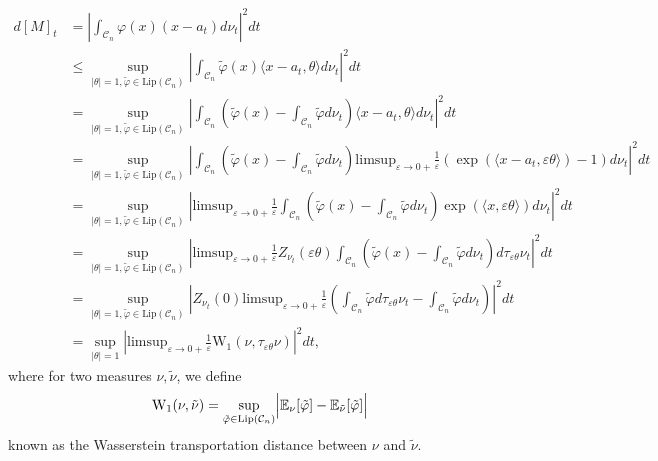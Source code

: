 \documentclass[12pt]{article}
\def \EE {\mathbb E}
\def \eps {\varepsilon}
\def \DC {\mathcal{C}_n}
\def \limsup {\mathrm{limsup}}
\theoremstyle{definition}
\theoremstyle{remark}
\begin{document}
\begin{align}
d [M]_t & = \left | \int_{\DC} \varphi(x)  (x-a_t) d \nu_t  \right |^2 dt \nonumber \\
& \leq \sup_{|\theta|=1, \tilde \varphi \in \mathrm{Lip}(\DC)}  \left | \int_{\DC} \tilde \varphi(x)  \langle x-a_t, \theta \rangle d \nu_t \right |^2 dt \nonumber \\
& = \sup_{|\theta|=1, \tilde \varphi \in \mathrm{Lip}(\DC)}  \left | \int_{\DC} \left (\tilde \varphi(x) -\int_{\DC} \tilde \varphi d \nu_t \right )  \langle x-a_t, \theta \rangle d \nu_t \right |^2 dt \nonumber \\
& = \sup_{|\theta|=1, \tilde \varphi \in \mathrm{Lip}(\DC)}  \left | \int_{\DC} \left (\tilde \varphi(x) -\int_{\DC} \tilde \varphi d \nu_t \right )  \limsup_{\eps \to 0+} \frac{1}{\eps}   \left (\exp \left (\langle x-a_t, \eps \theta \rangle \right ) - 1 \right ) d \nu_t \right |^2 dt \nonumber \\
& = \sup_{|\theta|=1, \tilde \varphi \in \mathrm{Lip}(\DC)}  \left | \limsup_{\eps \to 0+} \frac{1}{\eps} \int_{\DC} \left (\tilde \varphi(x) -\int_{\DC} \tilde \varphi d \nu_t \right ) \exp \left (\langle x, \eps \theta \rangle \right ) d \nu_t \right |^2 dt \nonumber \\
& = \sup_{|\theta|=1, \tilde \varphi \in \mathrm{Lip}(\DC)}  \left | \limsup_{\eps \to 0+} \frac{1}{\eps} Z_{\nu_t} (\eps \theta) \int_{\DC} \left (\tilde \varphi(x) - \int_{\DC} \tilde \varphi d \nu_t \right ) d \tau_{\eps \theta} \nu_t \right |^2 dt \nonumber \\
& = \sup_{|\theta|=1, \tilde \varphi \in \mathrm{Lip}(\DC)}  \left | Z_{\nu_t} (0) \limsup_{\eps \to 0+} \frac{1}{\eps} \left (\int_{\DC} \tilde \varphi d \tau_{\eps \theta} \nu_t - \int_{\DC} \tilde \varphi d \nu_t \right )  \right |^2 dt \nonumber \\ 
& = \sup_{|\theta|=1} \left |\limsup_{\eps \to 0+} \frac{1}{\eps} \mathrm{W}_1 ( \nu, \tau_{\eps \theta} \nu ) \right |^2 dt, \label{eq:wass}
\end{align}
where for two measures $\nu,\tilde \nu$, we define
$$
\mathrm{W}_1(\nu,\tilde \nu) = \sup_{\tilde \varphi \in \mathrm{Lip}(\DC)} \Bigl |\EE_{\nu}[\tilde \varphi] - \EE_{\tilde \nu}[\tilde \varphi] \Bigr |
$$
known as the Wasserstein transportation distance between $\nu$ and $\tilde \nu$. \\
\end{document}
